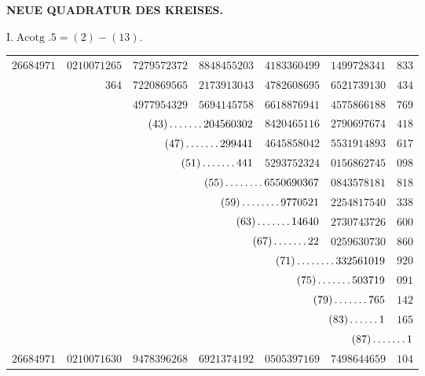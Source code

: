 \clearpage
\renewcommand{\BookRunningTitle}{Neue Quadratur des Kreises}
%
\begin{center}\textbf{NEUE QUADRATUR DES KREISES.}\end{center}
\begin{center}I.\quad $\operatorname{Acotg}.5=(2)-(13).$\end{center}
\begingroup\fontsize{8.5}{11}\selectfont\setlength{\tabcolsep}{2pt}
\begin{longtable}{@{}rrrrrrr@{}}
\hline
$26684971$ & $0210071265$ & $7279572372$ & $8848455203$ & $4183360499$ & $1499728341$ & $833$\\
 & $364$ & $7220869565$ & $2173913043$ & $4782608695$ & $6521739130$ & $434$\\
 &  & $4977954329$ & $5694145758$ & $6618876941$ & $4575866188$ & $769$\\
 &  & \multicolumn{2}{r}{$(43)\mathinner{.\,.\,.\,.\,.\,.\,.}204560302$} & $8420465116$ & $2790697674$ & $418$\\
 &  & \multicolumn{2}{r}{$(47)\mathinner{.\,.\,.\,.\,.\,.\,.}299441$} & $4645858042$ & $5531914893$ & $617$\\
 &  & \multicolumn{2}{r}{$(51)\mathinner{.\,.\,.\,.\,.\,.\,.}441$} & $5293752324$ & $0156862745$ & $098$\\
 &  &  & \multicolumn{2}{r}{$(55)\mathinner{.\,.\,.\,.\,.\,.\,.\,.}6550690367$} & $0843578181$ & $818$\\
 &  &  & \multicolumn{2}{r}{$(59)\mathinner{.\,.\,.\,.\,.\,.\,.\,.}9770521$} & $2254817540$ & $338$\\
 &  &  & \multicolumn{2}{r}{$(63)\mathinner{.\,.\,.\,.\,.\,.\,.}14640$} & $2730743726$ & $600$\\
 &  &  & \multicolumn{2}{r}{$(67)\mathinner{.\,.\,.\,.\,.\,.\,.}22$} & $0259630730$ & $860$\\
 &  &  &  & \multicolumn{2}{r}{$(71)\mathinner{.\,.\,.\,.\,.\,.\,.\,.}332561019$} & $920$\\
 &  &  &  & \multicolumn{2}{r}{$(75)\mathinner{.\,.\,.\,.\,.\,.\,.}503719$} & $091$\\
 &  &  &  & \multicolumn{2}{r}{$(79)\mathinner{.\,.\,.\,.\,.\,.\,.}765$} & $142$\\
 &  &  &  & \multicolumn{2}{r}{$(83)\mathinner{.\,.\,.\,.\,.\,.}1$} & $165$\\
 &  &  &  &  & \multicolumn{2}{r}{$(87)\mathinner{.\,.\,.\,.\,.\,.\,.}1$}\\
\hline
$26684971$ & $0210071630$ & $9478396268$ & $6921374192$ & $0505397169$ & $7498644659$ & $104$\\

\end{longtable}
